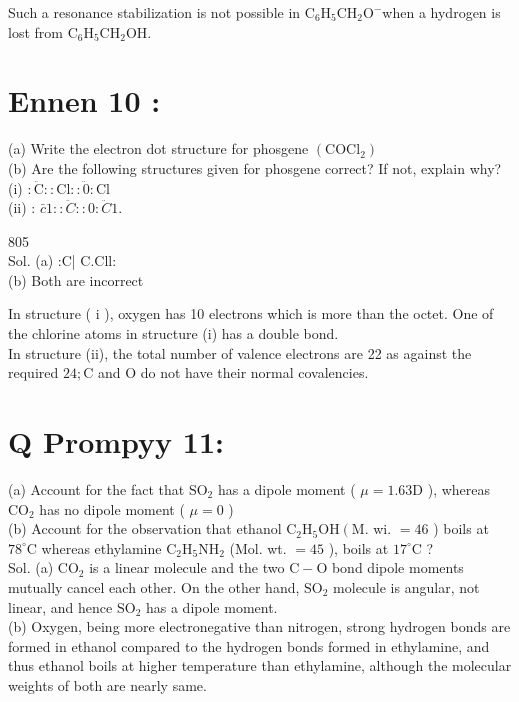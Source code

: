 \documentclass[10pt]{article}
\begin{document}
Such a resonance stabilization is not possible in $\mathrm{C}_{6} \mathrm{H}_{5} \mathrm{CH}_{2} \mathrm{O}^{-}$when a hydrogen is lost from $\mathrm{C}_{6} \mathrm{H}_{5} \mathrm{CH}_{2} \mathrm{OH}$.

\section*{Ennen 10 :}
(a) Write the electron dot structure for phosgene $\left(\mathrm{COCl}_{2}\right)$\\
(b) Are the following structures given for phosgene correct? If not, explain why?\\
(i) $: \ddot{\mathrm{C}}:: \mathrm{Cl}:: \ddot{0}: \mathrm{Cl}$\\
(ii) : $\bar{c} 1:: \ddot{C}:: 0: \ddot{C} 1$.

805\\
Sol. (a) :C゚| C.Cll:\\
(b) Both are incorrect

In structure ( i ), oxygen has 10 electrons which is more than the octet. One of the chlorine atoms in structure (i) has a double bond.\\
In structure (ii), the total number of valence electrons are 22 as against the required $24 ; \mathrm{C}$ and O do not have their normal covalencies.

\section*{Q Prompyy 11:}
(a) Account for the fact that $\mathrm{SO}_{2}$ has a dipole moment ( $\mu=1.63 \mathrm{D}$ ), whereas $\mathrm{CO}_{2}$ has no dipole moment ( $\mu=0$ )\\
(b) Account for the observation that ethanol $\mathrm{C}_{2} \mathrm{H}_{5} \mathrm{OH}\left(\mathrm{M}\right.$. wi. $=46$ ) boils at $78^{\circ} \mathrm{C}$ whereas ethylamine $\mathrm{C}_{2} \mathrm{H}_{5} \mathrm{NH}_{2}$ (Mol. wt. $=45$ ), boils at $17^{\circ} \mathrm{C}$ ?\\
Sol. (a) $\mathrm{CO}_{2}$ is a linear molecule and the two $\mathrm{C}-\mathrm{O}$ bond dipole moments mutually cancel each other. On the other hand, $\mathrm{SO}_{2}$ molecule is angular, not linear, and hence $\mathrm{SO}_{2}$ has a dipole moment.\\
(b) Oxygen, being more electronegative than nitrogen, strong hydrogen bonds are formed in ethanol compared to the hydrogen bonds formed in ethylamine, and thus ethanol boils at higher temperature than ethylamine, although the molecular weights of both are nearly same.
\end{document}
